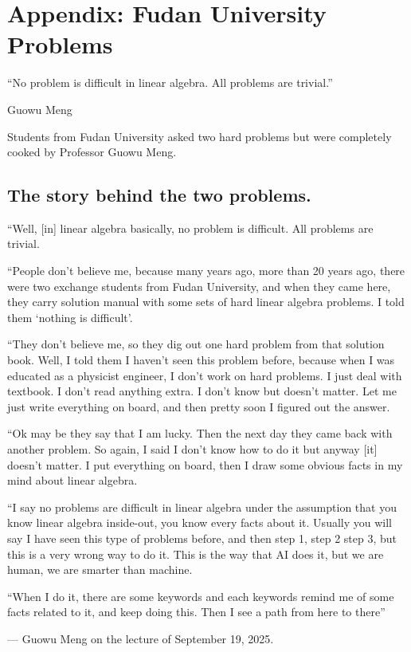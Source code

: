 \chapter*{Appendix: Fudan University Problems}\label{appendix:fudan_problems}

\epigraph{``No problem is difficult in linear algebra. All problems are trivial.''}{Guowu Meng}

Students from Fudan University asked two hard problems but were completely cooked by Professor Guowu Meng.

\section*{The story behind the two problems.}

``Well, [in] linear algebra basically, no problem is difficult. All problems are trivial.

``People don't believe me, because many years ago, more than 20 years ago, there were two exchange students from Fudan University, and when they came here, they carry solution manual with some sets of hard linear algebra problems. I told them `nothing is difficult'.

``They don't believe me, so they dig out one hard problem from that solution book. Well, I told them I haven't seen this problem before, because when I was educated as a physicist engineer, I don't work on hard problems. I just deal with textbook. I don't read anything extra. I don't know but doesn't matter. Let me just write everything on board, and then pretty soon I figured out the answer.

``Ok may be they say that I am lucky. Then the next day they came back with another problem. So again, I said I don't know how to do it but anyway [it] doesn't matter. I put everything on board, then I draw some obvious facts in my mind about linear algebra.

``I say no problems are difficult in linear algebra under the assumption that you know linear algebra inside-out, you know every facts about it. Usually you will say I have seen this type of problems before, and then step 1, step 2 step 3, but this is a very wrong way to do it. This is the way that AI does it, but we are human, we are smarter than machine.

``When I do it, there are some keywords and each keywords remind me of some facts related to it, and keep doing this. Then I see a path from here to there''

\begin{flushright}
  --- Guowu Meng on the lecture of September 19, 2025.
\end{flushright}

